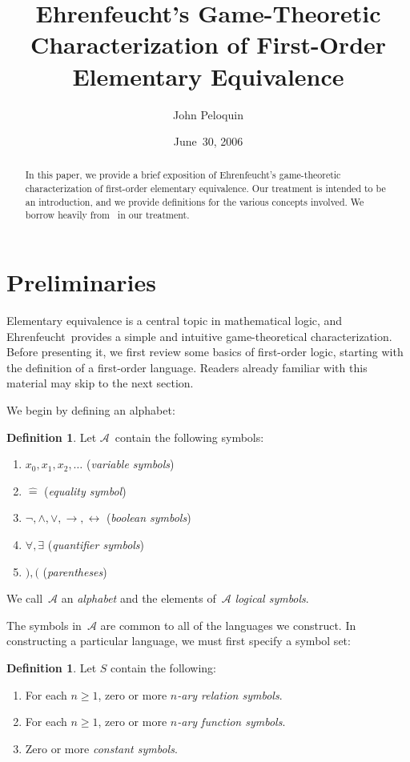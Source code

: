 \documentclass[letterpaper]{article}
\title{Ehrenfeucht's Game-Theoretic Characterization of First-Order Elementary Equivalence}
\author{John Peloquin}
\date{June~30, 2006}
\newcommand{\lequ}{\mathrel{\widehat{=}}}
\newcommand{\limp}{\rightarrow}
\newcommand{\liff}{\leftrightarrow}
\newcommand{\ef}{Ehrenfeucht}
\numberwithin{equation}{section}
\theoremstyle{plain}
\theoremstyle{definition}
\newtheorem{defn}[equation]{Definition}
\begin{document}
\maketitle
\begin{abstract}
In this paper, we provide a brief exposition of \ef's game-theoretic characterization of first-order elementary equivalence. Our treatment is intended to be an introduction, and we provide definitions for the various concepts involved. We borrow heavily from~\cite{ebbing94} in our treatment.
\end{abstract}
\section{Preliminaries}
\noindent Elementary equivalence is a central topic in mathematical logic, and \ef\ provides a simple and intuitive game-theoretical characterization. Before presenting it, we first review some basics of first-order logic, starting with the definition of a first-order language. Readers already familiar with this material may skip to the next section.

We begin by defining an alphabet:
\begin{defn}
Let $\mathcal{A}$~contain the following symbols:
\begin{enumerate}[itemsep=0pt]
\item $x_0,x_1,x_2,\ldots$ (\emph{variable symbols})
\item $\lequ$ (\emph{equality symbol})
\item $\lnot,\land,\lor,\limp,\liff$ (\emph{boolean symbols})
\item $\forall,\exists$ (\emph{quantifier symbols})
\item $),($ (\emph{parentheses})
\end{enumerate}
We call~$\mathcal{A}$ an \emph{alphabet} and the elements of~$\mathcal{A}$ \emph{logical symbols}.
\end{defn}

The symbols in~$\mathcal{A}$ are common to all of the languages we construct. In constructing a particular language, we must first specify a symbol set:
\begin{defn}
Let $S$ contain the following:
\begin{enumerate}[itemsep=0pt]
\item For each $n\ge1$, zero or more \emph{$n$-ary relation symbols}.
\item For each $n\ge1$, zero or more \emph{$n$-ary function symbols}.
\item Zero or more \emph{constant symbols}.
\end{enumerate}
\end{defn}
\end{document}
